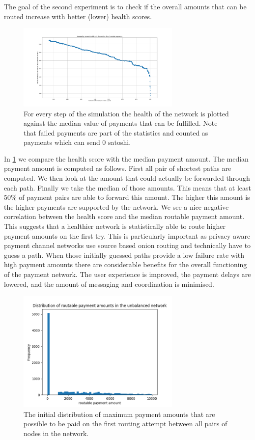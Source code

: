 \documentclass[a4paper]{paper}
\begin{document}
The goal of the second experiment is to check if the overall amounts that can be routed increase with better (lower) health scores.

\begin{figure}
 \centering
 \includegraphics[width=8cm]{code/results/routabilityTest/health vs payment amt.png}
 \caption{For every step of the simulation the health of the network is plotted against the median value of payments that can be fulfilled. Note that failed payments are part of the statistics and counted as payments which can send $0$ satoshi.}
 \label{fig:healthVsPayment}
\end{figure}

In \cref{fig:healthVsPayment} we compare the health score with the median payment amount.
The median payment amount is computed as follows.
First all pair of shortest paths are computed.
We then look at the amount that could actually be forwarded through each path.
Finally we take the median of those amounts.
This means that at least $50\%$ of payment pairs are able to forward this amount.
The higher this amount is the higher payments are supported by the network.
We see a nice negative correlation between the health score and the median routable payment amount.
This suggests that a healthier network is statistically able to route higher payment amounts on the first try.
This is particularly important as privacy aware payment channel networks use source based onion routing and technically have to guess a path. When those initially guessed paths provide a low failure rate with high payment amounts there are considerable benefits for the overall functioning of the payment network. 
The user experience is improved, the payment delays are lowered, and the amount of messaging and coordination is minimised. 

\begin{figure}
 \centering
 \includegraphics[width=8cm]{code/results/routabilityTest/paymentamtUnbalanced.png}
 \caption{The initial distribution of maximum payment amounts that are possible to be paid on the first routing attempt between all pairs of nodes in the network.}
 \label{fig:paymentUnbalanced}
\end{figure}
\end{document}
